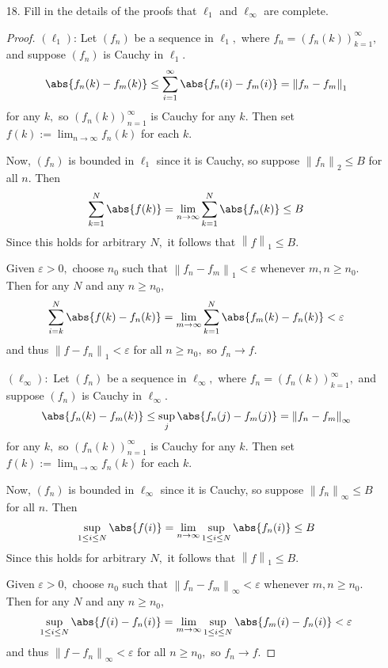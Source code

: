 \documentclass{article}
\begin{document}
\begin{itemize}
	\item[18.] Fill in the details of the proofs that $\ell_1$ and $\ell_\infty$ are complete.
		\begin{proof}
			$(\ell_1)$: Let $(f_n)$ be a sequence in $\ell_1,$ where $f_n=(f_n(k))_{k=1}^\infty,$ and suppose $(f_n)$ is Cauchy in $\ell_1.$
			\begin{align*}
				\abs{f_n(k)-f_m(k)} \le \sum_{i=1}^{\infty}\abs{f_n(i)-f_m(i)} = \left\lVert f_n-f_m \right\rVert_1
			\end{align*}
			for any $k,$ so $(f_n(k))_{n=1}^\infty$ is Cauchy for any $k.$ Then set $f(k):=\lim_{n\to\infty} f_n(k)$ for each $k.$

			Now, $(f_n)$ is bounded in $\ell_1$ since it is Cauchy, so suppose $\left\lVert f_n \right\rVert_2\le B$ for all $n.$ Then
			\begin{align*}
				\sum_{k=1}^{N} \abs{f(k)} = \lim_{n\to\infty} \sum_{k=1}^{N} \abs{f_n(k)}\le B
			\end{align*}
			Since this holds for arbitrary $N,$ it follows that $\left\lVert f \right\rVert_1\le B.$

			Given $\varepsilon>0,$ choose $n_0$ such that $\left\lVert f_n-f_m \right\rVert_1<\varepsilon$ whenever $m, n\ge n_0.$ Then for any $N$ and any $n\ge n_0,$ 
			\begin{align*}
				\sum_{i=k}^{N} \abs{f(k)-f_n(k)} = \lim_{m\to\infty} \sum_{k=1}^{N} \abs{f_m(k)-f_n(k)}< \varepsilon
			\end{align*}
			and thus $\left\lVert f-f_n \right\rVert_1<\varepsilon$ for all $n\ge n_0,$ so $f_n\to f.$

			$(\ell_\infty):$ Let $(f_n)$ be a sequence in $\ell_\infty,$ where $f_n=(f_n(k))_{k=1}^\infty,$ and suppose $(f_n)$ is Cauchy in $\ell_\infty.$
			\begin{align*}
				\abs{f_n(k)-f_m(k)} \le \sup_j\abs{f_n(j)-f_m(j)} = \left\lVert f_n-f_m \right\rVert_\infty
			\end{align*}
			for any $k,$ so $(f_n(k))_{n=1}^\infty$ is Cauchy for any $k.$ Then set $f(k):=\lim_{n\to\infty} f_n(k)$ for each $k.$

			Now, $(f_n)$ is bounded in $\ell_\infty$ since it is Cauchy, so suppose $\left\lVert f_n \right\rVert_\infty\le B$ for all $n.$ Then
			\begin{align*}
				\sup_{1\le i\le N}\abs{f(i)} = \lim_{n\to\infty} \sup_{1\le i\le N}\abs{f_n(i)}\le B
			\end{align*}
			Since this holds for arbitrary $N,$ it follows that $\left\lVert f \right\rVert_1\le B.$

			Given $\varepsilon>0,$ choose $n_0$ such that $\left\lVert f_n-f_m \right\rVert_\infty<\varepsilon$ whenever $m, n\ge n_0.$ Then for any $N$ and any $n\ge n_0,$ 
			\begin{align*}
				\sup_{1\le i\le N}\abs{f(i)-f_n(i)} = \lim_{m\to\infty} \sup_{1\le i\le N} \abs{f_m(i)-f_n(i)} < \varepsilon
			\end{align*}
			and thus $\left\lVert f-f_n \right\rVert_\infty<\varepsilon$ for all $n\ge n_0,$ so $f_n\to f.$

		\end{proof}
		
\end{itemize}
\end{document}
